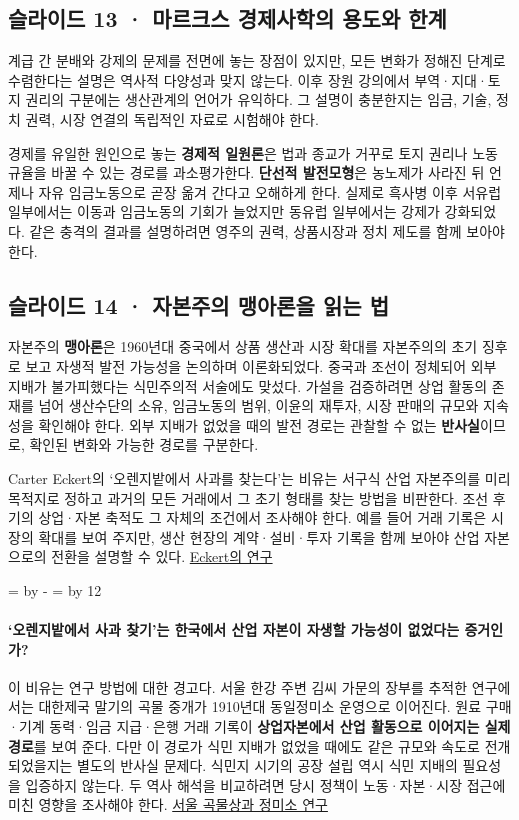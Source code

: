 \documentclass[10pt,a4paper]{article}
\newcommand{\ReserveQuestionSpace}{%
  \par\begingroup
  \dimen0=\pagegoal \advance\dimen0 by -\pagetotal
  \dimen2=\baselineskip \multiply\dimen2 by 12
  \ifdim\dimen0<\dimen2 \newpage\fi
  \endgroup}
\begin{document}
\subsection{슬라이드 13 · 마르크스 경제사학의 용도와 한계}
계급 간 분배와 강제의 문제를 전면에 놓는 장점이 있지만, 모든 변화가 정해진 단계로 수렴한다는 설명은 역사적 다양성과 맞지 않는다. 이후 장원 강의에서 부역·지대·토지 권리의 구분에는 생산관계의 언어가 유익하다. 그 설명이 충분한지는 임금, 기술, 정치 권력, 시장 연결의 독립적인 자료로 시험해야 한다.\par

경제를 유일한 원인으로 놓는 \textbf{경제적 일원론}은 법과 종교가 거꾸로 토지 권리나 노동 규율을 바꿀 수 있는 경로를 과소평가한다. \textbf{단선적 발전모형}은 농노제가 사라진 뒤 언제나 자유 임금노동으로 곧장 옮겨 간다고 오해하게 한다. 실제로 흑사병 이후 서유럽 일부에서는 이동과 임금노동의 기회가 늘었지만 동유럽 일부에서는 강제가 강화되었다. 같은 충격의 결과를 설명하려면 영주의 권력, 상품시장과 정치 제도를 함께 보아야 한다.\par

\subsection{슬라이드 14 · 자본주의 맹아론을 읽는 법}
자본주의 \textbf{맹아론}은 1960년대 중국에서 상품 생산과 시장 확대를 자본주의의 초기 징후로 보고 자생적 발전 가능성을 논의하며 이론화되었다. 중국과 조선이 정체되어 외부 지배가 불가피했다는 식민주의적 서술에도 맞섰다. 가설을 검증하려면 상업 활동의 존재를 넘어 생산수단의 소유, 임금노동의 범위, 이윤의 재투자, 시장 판매의 규모와 지속성을 확인해야 한다. 외부 지배가 없었을 때의 발전 경로는 관찰할 수 없는 \textbf{반사실}이므로, 확인된 변화와 가능한 경로를 구분한다.\par

Carter Eckert의 ‘오렌지밭에서 사과를 찾는다’는 비유는 서구식 산업 자본주의를 미리 목적지로 정하고 과거의 모든 거래에서 그 초기 형태를 찾는 방법을 비판한다. 조선 후기의 상업·자본 축적도 그 자체의 조건에서 조사해야 한다. 예를 들어 거래 기록은 시장의 확대를 보여 주지만, 생산 현장의 계약·설비·투자 기록을 함께 보아야 산업 자본으로의 전환을 설명할 수 있다. \href{https://uwapress.uw.edu/book/9780295993881/offspring-of-empire/}{Eckert의 연구}\par

\ReserveQuestionSpace
\paragraph{‘오렌지밭에서 사과 찾기’는 한국에서 산업 자본이 자생할 가능성이 없었다는 증거인가?}
이 비유는 연구 방법에 대한 경고다. 서울 한강 주변 김씨 가문의 장부를 추적한 연구에서는 대한제국 말기의 곡물 중개가 1910년대 동일정미소 운영으로 이어진다. 원료 구매·기계 동력·임금 지급·은행 거래 기록이 \textbf{상업자본에서 산업 활동으로 이어지는 실제 경로}를 보여 준다. 다만 이 경로가 식민 지배가 없었을 때에도 같은 규모와 속도로 전개되었을지는 별도의 반사실 문제다. 식민지 시기의 공장 설립 역시 식민 지배의 필요성을 입증하지 않는다. 두 역사 해석을 비교하려면 당시 정책이 노동·자본·시장 접근에 미친 영향을 조사해야 한다. \href{https://ideas.repec.org/a/cai/recosp/reco\_pr2\_0148.html}{서울 곡물상과 정미소 연구}\par
\end{document}

